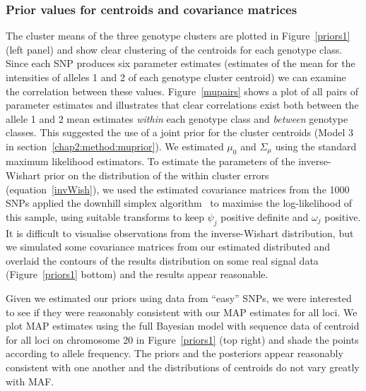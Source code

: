 \subsubsection{Prior values for centroids and covariance matrices}
The cluster means of the three genotype clusters are plotted in Figure~\ref{priors1} (left panel) and show clear clustering of the centroids for each genotype class. Since each SNP produces six parameter estimates (estimates of the mean for the intensities of alleles 1 and 2 of each genotype cluster centroid) we can examine the correlation between these values. Figure~\ref{mupairs} shows a plot of all pairs of parameter estimates and illustrates that clear correlations exist both between the allele 1 and 2 mean estimates \emph{within} each genotype class and \emph{between} genotype classes. This suggested the use of a joint prior for the cluster centroids (Model 3 in section~\ref{chap2:method:muprior}). We estimated $\mu_0$ and $\Sigma_{\mu}$ using the standard maximum likelihood estimators. To estimate the parameters of the inverse-Wishart prior on the distribution of the within cluster errors (equation~\ref{invWish}), we used the estimated covariance matrices from the 1000 SNPs applied the downhill simplex algorithm~\citep{nelder1965downhill} to maximise the log-likelihood of this sample, using suitable transforms to keep $\psi_j$ positive definite and $\omega_j$ positive.  It is difficult to visualise observations from the inverse-Wishart distribution, but we simulated some covariance matrices from our estimated distributed and overlaid the contours of the results distribution on some real signal data (Figure~\ref{priors1} bottom) and the results appear reasonable.

Given we estimated our priors using data from ``easy'' SNPs, we were interested to see if they were reasonably consistent with our MAP estimates for all loci.  We plot MAP estimates using the full Bayesian model with sequence data of centroid for all loci on chromosome 20 in Figure~\ref{priors1} (top right) and shade the points according to allele frequency.  The priors and the posteriors appear reasonably consistent with one another and the distributions of centroids do not vary greatly with MAF.

